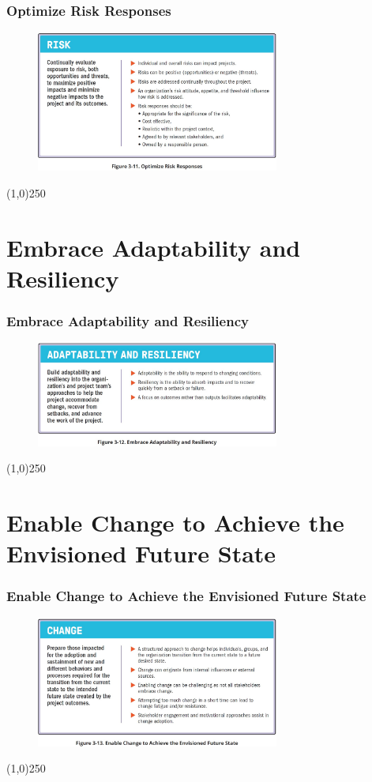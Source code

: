 \begin{frame}
\frametitle{Optimize Risk Responses}
 \begin{figure}
    \centering
        \includegraphics[width = 8cm]{../images/standard/Fig3-11.jpg}
    \label{standardfig:3-11}
 \end{figure}
\end{frame}
\begin{center}\line(1,0){250}\end{center}



\section{Embrace Adaptability and Resiliency}

\begin{frame}
\frametitle{Embrace Adaptability and Resiliency}
 \begin{figure}
    \centering
        \includegraphics[width = 8cm]{../images/standard/Fig3-12.jpg}
    \label{standardfig:3-12}
 \end{figure}
\end{frame}
\begin{center}\line(1,0){250}\end{center}



\section{Enable Change to Achieve the Envisioned Future State}

\begin{frame}
\frametitle{Enable Change to Achieve the Envisioned Future State}
 \begin{figure}
    \centering
        \includegraphics[width = 8cm]{../images/standard/Fig3-13.jpg}
    \label{standardfig:3-13}
 \end{figure}
\end{frame}
\begin{center}\line(1,0){250}\end{center}





